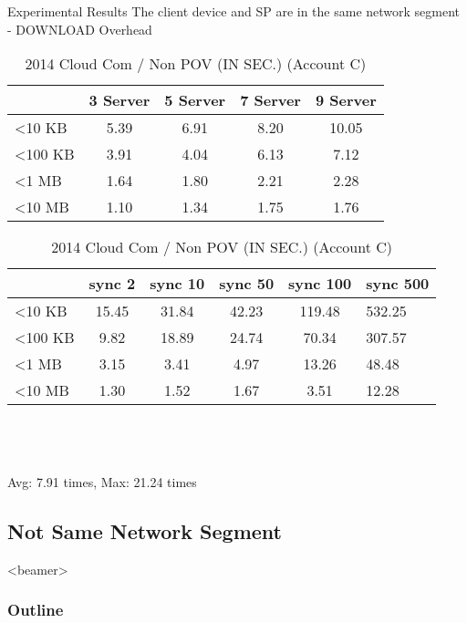 \begin{frame}{Experimental Results}
{The client device and SP are in the same network segment - DOWNLOAD Overhead}
	\scriptsize
    \begin{table}[]
    \centering
    \caption{My Method / Non POV (IN SEC.) (Account C)}
    \begin{tabular}{lcccc}
                         & 3 Server & 5 Server & 7 Server & 9 Server  \\ \hline
        \textless 10 KB  & 5.39 & 6.91 & 8.20 & 10.05 \\ \hline
        \textless 100 KB & 3.91 & 4.04 & 6.13 & 7.12  \\ \hline
        \textless 1 MB   & 1.64 & 1.80 & 2.21 & 2.28  \\ \hline
        \textless 10 MB  & 1.10 & 1.34 & 1.75 & 1.76  \\ \hline
    \end{tabular}
    \caption{2014 Cloud Com / Non POV (IN SEC.) (Account C)}
    \begin{tabular}{lccccl}
                         & sync 2    & sync 10   & sync 50   & sync 100   & sync 500  \\ \hline
        \textless 10 KB  & 15.45 & 31.84 & 42.23 & 119.48 & 532.25 \\ \hline
        \textless 100 KB & 9.82  & 18.89 & 24.74 & 70.34  & 307.57 \\ \hline
        \textless 1 MB   & 3.15  & 3.41  & 4.97  & 13.26  & 48.48  \\ \hline
        \textless 10 MB  & 1.30  & 1.52  & 1.67  & 3.51   & 12.28  \\ \hline
    \end{tabular}
    ~\\
    ~\\
    ~\\
    \alert{Avg: 7.91 times, Max: 21.24 times}
    \end{table}
\end{frame}

\subsection{Not Same Network Segment}
\begin{frame}<beamer>
    \frametitle{Outline}
    \tableofcontents[currentsubsection]
\end{frame}

